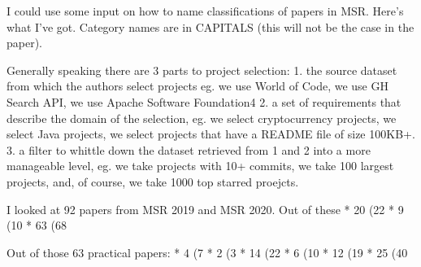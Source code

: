 
I could use some input on how to name classifications of papers in MSR. Here's what I've got. Category names are in CAPITALS (this will not be the case in the paper).

Generally speaking there are 3 parts to project selection: 
1. the source dataset from which the authors select projects eg. we use World of Code, we use GH Search API, we use Apache Software Foundation4
2. a set of requirements that describe the domain of the selection, eg. we select cryptocurrency projects, we select Java projects, we select projects that have a README file of size 100KB+.
3. a filter to whittle down the dataset retrieved from 1 and 2 into a more manageable level, eg. we take projects with 10+ commits, we take 100 largest projects, and, of course, we take 1000 top starred proejcts.

I looked at 92 papers from MSR 2019 and MSR 2020. Out of these 
* 20 (22%
* 9 (10%
* 63 (68%

Out of those 63 practical papers:
* 4 (7%
* 2 (3%
* 14 (22%
* 6 (10%
* 12 (19%
* 25 (40%

